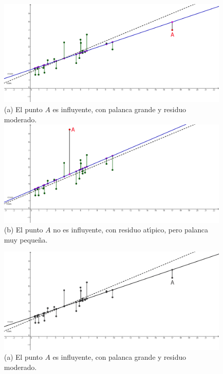 \begin{figure}[p]
\begin{center}
\begin{enColor}
\includegraphics[width=13cm]{../fig/Cap10-PuntosInfluyentesRegresion-01.png}\\[3mm]
(a) El punto $A$ es influyente, con palanca grande y residuo moderado.\\[7mm]
\includegraphics[width=13cm]{../fig/Cap10-PuntosInfluyentesRegresion-02.png}\\[3mm]
(b) El punto $A$ no es influyente, con residuo at\'{\i}pico, pero palanca muy peque\~na.\\[3mm]
\end{enColor}
\begin{bn}
\includegraphics[width=13cm]{../fig/Cap10-PuntosInfluyentesRegresion-01-bn.png}\\[3mm]
(a) El punto $A$ es influyente, con palanca grande y residuo moderado.\\[7mm]


\end{bn}
\end{center}
\end{figure}
